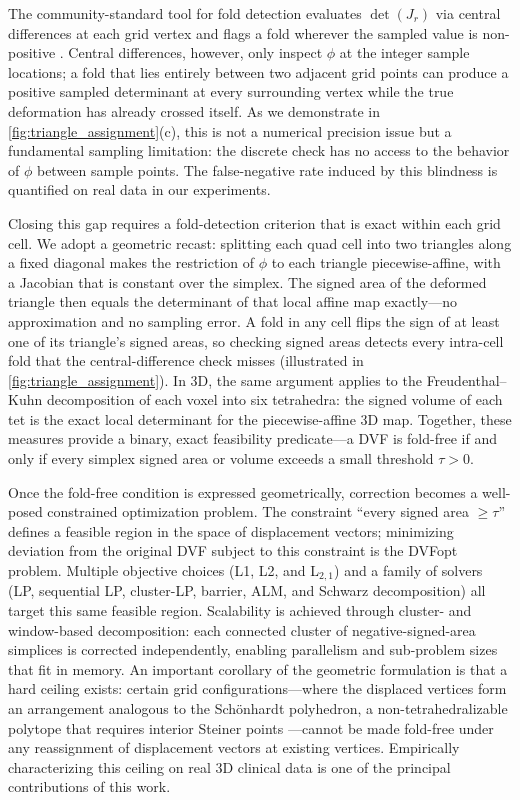 The community-standard tool for fold detection evaluates $\det(J_r)$ via central differences at each grid vertex and flags a fold wherever the sampled value is non-positive \cite{learn2reg2023}. Central differences, however, only inspect $\phi$ at the integer sample locations; a fold that lies entirely between two adjacent grid points can produce a positive sampled determinant at every surrounding vertex while the true deformation has already crossed itself. As we demonstrate in \autoref{fig:triangle_assignment}(c), this is not a numerical precision issue but a fundamental sampling limitation: the discrete check has no access to the behavior of $\phi$ between sample points. The false-negative rate induced by this blindness is quantified on real data in our experiments.

Closing this gap requires a fold-detection criterion that is exact within each grid cell. We adopt a geometric recast: splitting each quad cell into two triangles along a fixed diagonal makes the restriction of $\phi$ to each triangle piecewise-affine, with a Jacobian that is constant over the simplex. The signed area of the deformed triangle then equals the determinant of that local affine map exactly---no approximation and no sampling error. A fold in any cell flips the sign of at least one of its triangle's signed areas, so checking signed areas detects every intra-cell fold that the central-difference check misses (illustrated in \autoref{fig:triangle_assignment}). In 3D, the same argument applies to the Freudenthal--Kuhn decomposition of each voxel into six tetrahedra: the signed volume of each tet is the exact local determinant for the piecewise-affine 3D map. Together, these measures provide a binary, exact feasibility predicate---a DVF is fold-free if and only if every simplex signed area or volume exceeds a small threshold $\tau > 0$.

Once the fold-free condition is expressed geometrically, correction becomes a well-posed constrained optimization problem. The constraint ``every signed area $\geq \tau$'' defines a feasible region in the space of displacement vectors; minimizing deviation from the original DVF subject to this constraint is the DVFopt problem. Multiple objective choices (L1, L2, and L$_{2,1}$) and a family of solvers (LP, sequential LP, cluster-LP, barrier, ALM, and Schwarz decomposition) all target this same feasible region. Scalability is achieved through cluster- and window-based decomposition: each connected cluster of negative-signed-area simplices is corrected independently, enabling parallelism and sub-problem sizes that fit in memory. An important corollary of the geometric formulation is that a hard ceiling exists: certain grid configurations---where the displaced vertices form an arrangement analogous to the Sch{\"o}nhardt polyhedron, a non-tetrahedralizable polytope that requires interior Steiner points \cite{schonhardt1928}---cannot be made fold-free under any reassignment of displacement vectors at existing vertices. Empirically characterizing this ceiling on real 3D clinical data is one of the principal contributions of this work.

